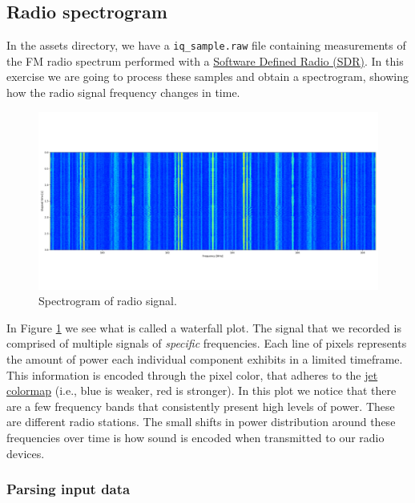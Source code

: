\subsection{Radio spectrogram}

In the assets directory, we have a \texttt{iq\_sample.raw} file containing
measurements of the FM radio spectrum performed with a
\href{https://blinry.org/50-things-with-sdr/}{Software Defined Radio (SDR)}. In
this exercise we are going to process these samples and obtain a spectrogram,
showing how the radio signal frequency changes in time.

\begin{figure}[h]
    \centering
    \includegraphics[width=\textwidth,keepaspectratio]{figures/waterfall.png}
    \caption{Spectrogram of radio signal.}
    \label{fig:spectrogram}
\end{figure}

In Figure \ref{fig:spectrogram} we see what is called a waterfall plot. The
signal that we recorded is comprised of multiple signals of \textit{specific}
frequencies. Each line of pixels represents the amount of power each individual
component exhibits in a limited timeframe. This information is encoded through
the pixel color, that adheres to the
\href{https://www.mathworks.com/help/matlab/ref/jet.html}{jet colormap} (i.e.,
blue is weaker, red is stronger). In this plot we notice that there are a few
frequency bands that consistently present high levels of power. These are
different radio stations. The small shifts in power distribution around these
frequencies over time is how sound is encoded when transmitted to our radio
devices.

\subsubsection{Parsing input data}

